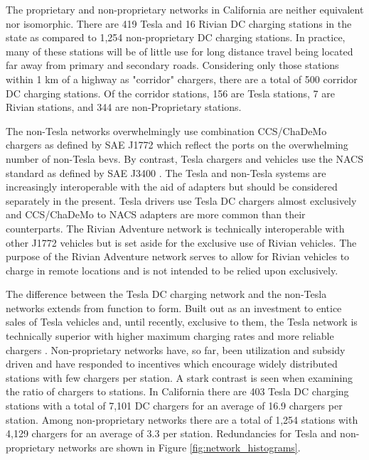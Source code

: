 \documentclass[11pt]{article}
\begin{document}
\begin{multicols}{2}

The proprietary and non-proprietary networks in California are neither equivalent nor isomorphic. There are 419 Tesla and 16 Rivian DC charging stations in the state as compared to 1,254 non-proprietary DC charging stations. In practice, many of these stations will be of little use for long distance travel being located far away from primary and secondary roads. Considering only those stations within 1 km of a highway as "corridor" chargers, there are a total of 500 corridor DC charging stations. Of the corridor stations, 156 are Tesla stations, 7 are Rivian stations, and 344 are non-Proprietary stations.

The non-Tesla networks overwhelmingly use combination CCS/ChaDeMo chargers as defined by SAE J1772 \cite{SAE_J1772} which reflect the ports on the overwhelming number of non-Tesla \glspl{bev}. By contrast, Tesla chargers and vehicles use the NACS standard as defined by SAE J3400 \cite{SAE_J3400}. The Tesla and non-Tesla systems are increasingly interoperable with the aid of adapters but should be considered separately in the present. Tesla drivers use Tesla DC chargers almost exclusively \cite{Visaria_2022} and CCS/ChaDeMo to NACS adapters are more common than their counterparts. The Rivian Adventure network is technically interoperable with other J1772 vehicles but is set aside for the exclusive use of Rivian vehicles. The purpose of the Rivian Adventure network serves to allow for Rivian vehicles to charge in remote locations and is not intended to be relied upon exclusively.

The difference between the Tesla DC charging network and the non-Tesla networks extends from function to form. Built out as an investment to entice sales of Tesla vehicles and, until recently, exclusive to them, the Tesla network is technically superior with higher maximum charging rates and more reliable chargers \cite{Rempel_2023, Kozumplik_2022}. Non-proprietary networks have, so far, been utilization and subsidy driven \cite{Gamage_2023} and have responded to incentives which encourage widely distributed stations with few chargers per station. A stark contrast is seen when examining the ratio of chargers to stations. In California there are 403 Tesla DC charging stations with a total of 7,101 DC chargers for an average of 16.9 chargers per station. Among non-proprietary networks there are a total of 1,254 stations with 4,129 chargers for an average of 3.3 per station. Redundancies for Tesla and non-proprietary networks are shown in Figure \ref{fig:network_histograms}. 



\end{multicols}
\end{document}
